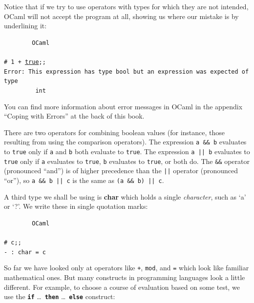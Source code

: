 \documentclass[]{book}
\newcommand\upquote[1]{\textquotesingle#1\textquotesingle}
\newcommand{\smspace}{\vspace{4mm}}
\begin{document}
\noindent Notice that if we try to use operators with types for which they are not intended, OCaml will not accept the program at all, showing us where our mistake is by underlining it:

\smspace
\noindent\verb!        OCaml!\\
\noindent\\
\noindent\texttt{\# 1 + \underline{\vphantom{g}true};;}\\
\noindent\texttt{Error:\ This expression has type bool but an expression was expected of type}\\
\noindent\verb!         int!
\smspace

\noindent You can find more information about error messages in OCaml in the appendix ``Coping with Errors'' at the back of this book.

\newcommand{\doublebar}{||}

There are two operators for combining boolean values (for instance, those resulting from using the comparison operators). The expression \texttt{a \&\& b} evaluates to \texttt{true} only if \texttt{a} and \texttt{b} both evaluate to \texttt{true}. The expression \index{\doublebar@\texttt{\doublebar}}\texttt{a || b} evaluates to \texttt{true} only if \texttt{a} evaluates to \texttt{true}, \texttt{b} evaluates to \texttt{true}, or both do. The \texttt{\&\&} operator  (pronounced ``and'') is of higher precedence than the \texttt{||} operator (pronounced ``or''), so \texttt{a \&\& b || c} is the same as \texttt{(a \&\& b) || c}.

A third type we shall be using is \textbf{\textrm{char}} which holds a single \textit{character}, such as `a' or `?'. We write these in single quotation marks:

\smspace
\noindent\verb!        OCaml!\\
\noindent\\
\noindent\texttt{\# \upquote{c};;}\\
\noindent\texttt{- :\ char = \upquote{c}}
\smspace

\noindent So far we have looked only at operators like \texttt{+}, \texttt{mod}, and \texttt{=} which look like familiar mathematical ones. But many constructs in programming languages look a little different. For example, to choose a course of evaluation based on some test, we use the \texttt{\textbf{if}} \ldots\ \texttt{\textbf{then}} \ldots\  \texttt{\textbf{else}} construct:
\end{document}
